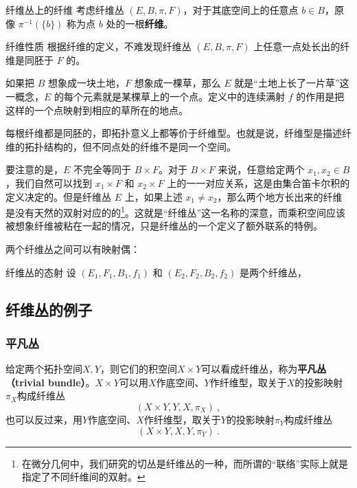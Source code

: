 \begin{definition}{纤维丛上的纤维}
考虑纤维丛 $(E, B, \pi, F)$，对于其底空间上的任意点 $b \in B$，原像 $\pi^{-1}(\{b\})$ 称为点 $b$ 处的一根\textbf{纤维}。
\end{definition}

\begin{corollary}{纤维性质}
根据纤维的定义，不难发现纤维丛 $(E, B, \pi, F)$ 上任意一点处长出的纤维是同胚于 $F$ 的。
\end{corollary}

如果把 $B$ 想象成一块土地，$F$ 想象成一棵草，那么 $E$ 就是“土地上长了一片草”这一概念，$E$ 的每个元素就是某棵草上的一个点。定义中的连续满射 $f$ 的作用是把这样的一个点映射到相应的草所在的地点。

每根纤维都是同胚的，即拓扑意义上都等价于纤维型。也就是说，纤维型是描述纤维的拓扑结构的，但不同点处的纤维不是同一个空间。

要注意的是，$E$ 不完全等同于 $B\times F$。对于 $B\times F$ 来说，任意给定两个 $x_1, x_2\in B$，我们自然可以找到 $x_1\times F$ 和 $x_2\times F$ 上的一一对应关系，这是由集合笛卡尔积的定义决定的。但是纤维丛 $E$ 上，如果上述 $x_1\not=x_2$，那么两个地方长出来的纤维是没有天然的双射对应的的\footnote{在微分几何中，我们研究的切丛是纤维丛的一种，而所谓的“联络”实际上就是指定了不同纤维间的双射。}。这就是“纤维丛”这一名称的深意，而乘积空间应该被想象纤维被粘在一起的情况，只是纤维丛的一个定义了额外联系的特例。

两个纤维丛之间可以有映射偶：

\begin{definition}{纤维丛的态射}
设 $(E_1, F_1, B_1, f_1)$ 和 $(E_2, F_2, B_2, f_2)$ 是两个纤维丛，
\end{definition}


\subsection{纤维丛的例子}

\subsubsection{平凡丛}


给定两个拓扑空间$X, Y$，则它们的积空间$X\times Y$可以看成纤维丛，称为\textbf{平凡丛（trivial bundle）}。$X\times Y$可以用$X$作底空间、$Y$作纤维型，取关于$X$的投影映射$\pi_X$构成纤维丛
\begin{equation}
(X\times Y, Y, X, \pi_X)~, 
\end{equation}
也可以反过来，用$Y$作底空间、$X$作纤维型，取关于$Y$的投影映射$\pi_Y$构成纤维丛
\begin{equation}
(X\times Y, X, Y, \pi_Y)~. 
\end{equation}


